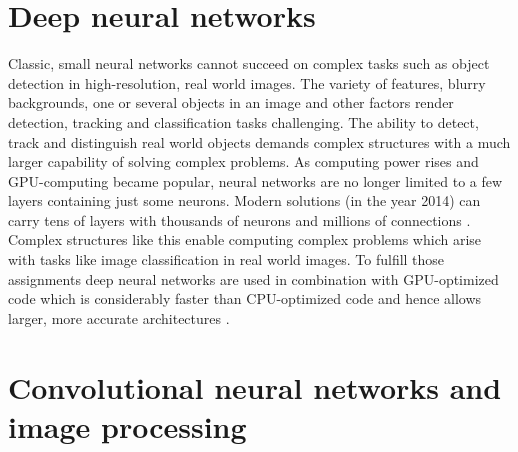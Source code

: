 \documentclass[12pt,twoside]{article}
\theoremstyle{plain}
\theoremstyle{definition}
\theoremstyle{remark}
\begin{document}
\section{Deep neural networks}
\label{sec:dnn}

Classic, small neural networks cannot succeed on complex tasks such as object detection in high-resolution, real world images. The variety of features, blurry backgrounds, one or several objects in an image and other factors render detection, tracking and classification tasks challenging. The ability to detect, track and distinguish real world objects demands complex structures with a much larger capability of solving complex problems. As computing power rises and GPU-computing became popular, neural networks are no longer limited to a few layers containing just some neurons. Modern solutions (in the year 2014) can carry tens of layers with thousands of neurons and millions of connections \cite{GoogleLargeScaleVideoClassification-Karpathy}. Complex structures like this enable computing complex problems which arise with tasks like image classification in real world images. To fulfill those assignments deep neural networks are used in combination with GPU-optimized code which is considerably faster than CPU-optimized code and hence allows larger, more accurate architectures \cite{MultiColumnDeepNeuralNetworksClassification-Ciresan}.





\section{Convolutional neural networks and image processing}
\label{sec:cnn}
\end{document}
